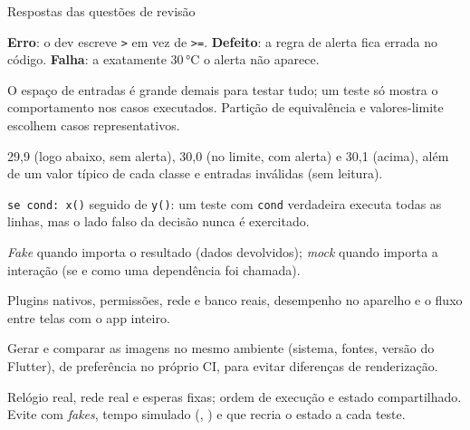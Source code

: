 \documentclass[aspectratio=169,10pt]{beamer}
\begin{document}
\begin{frame}{Respostas das questões de revisão}
  \begin{respostas}
    \item \textbf{Erro}: o dev escreve \texttt{>} em vez de \texttt{>=}. \textbf{Defeito}: a regra de alerta fica errada no código. \textbf{Falha}: a exatamente 30\,°C o alerta não aparece.
    \item O espaço de entradas é grande demais para testar tudo; um teste só mostra o comportamento nos casos executados. Partição de equivalência e valores-limite escolhem casos representativos.
    \item 29,9 (logo abaixo, sem alerta), 30,0 (no limite, com alerta) e 30,1 (acima), além de um valor típico de cada classe e entradas inválidas (sem leitura).
    \item \texttt{se cond: x()} seguido de \texttt{y()}: um teste com \texttt{cond} verdadeira executa todas as linhas, mas o lado falso da decisão nunca é exercitado.
    \item \emph{Fake} quando importa o resultado (dados devolvidos); \emph{mock} quando importa a interação (se e como uma dependência foi chamada).
    \item Plugins nativos, permissões, rede e banco reais, desempenho no aparelho e o fluxo entre telas com o app inteiro.
    \item Gerar e comparar as imagens no mesmo ambiente (sistema, fontes, versão do Flutter), de preferência no próprio CI, para evitar diferenças de renderização.
    \item Relógio real, rede real e esperas fixas; ordem de execução e estado compartilhado. Evite com \emph{fakes}, tempo simulado (, ) e  que recria o estado a cada teste.
  \end{respostas}
\end{frame}

\end{document}

